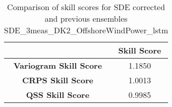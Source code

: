 
        \begin{table}[h!]
            \centering
            \begin{tabular}{|c|c|}
                \hline
                & \textbf{Skill Score}  \\
                \hline
                \textbf{Variogram Skill Score} & 1.1850  \\
                \hline
                \textbf{CRPS Skill Score} & 1.0013  \\
                \hline
                \textbf{QSS Skill Score} & 0.9985 \\
                \hline
            \end{tabular}
            \caption{Comparison of skill scores for SDE corrected and previous ensembles SDE_3meas_DK2_OffshoreWindPower_lstm}
            \label{table:skill_scores_comparison}
        \end{table}
        